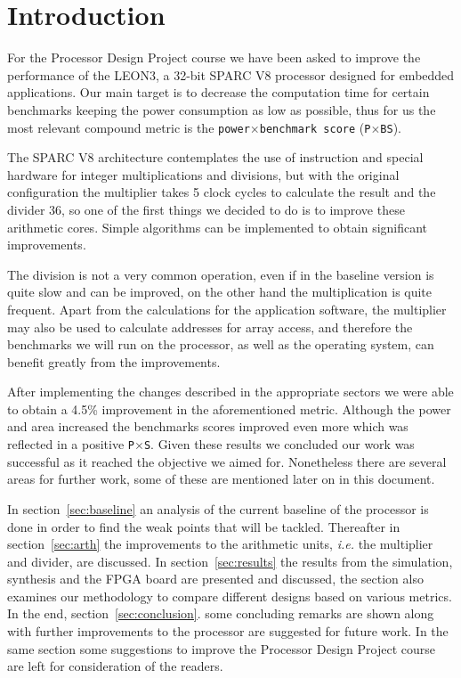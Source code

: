 
\section{Introduction}

For the Processor Design Project course we have been asked to improve the performance of the
LEON3, a 32-bit SPARC V8 processor designed for embedded applications.
Our main target is to decrease the computation time for certain benchmarks keeping the power
consumption as low as possible, thus for us the most relevant compound metric is the
\texttt{power}$\times$\texttt{benchmark score} (\texttt{P}$\times$\texttt{BS}).

The SPARC V8 architecture contemplates the use of instruction and special hardware for integer
multiplications and divisions, but with the original configuration the multiplier takes 5 clock cycles
to calculate the result and the divider 36, so one of the first things we decided to do is to improve
these arithmetic cores. Simple algorithms can be implemented to obtain significant improvements.

The division is not a very common operation, even if in the baseline version is quite slow and can be improved, on the other hand the multiplication is quite frequent. Apart from the calculations for the application software, the multiplier may also be used to calculate addresses for array access, and therefore the benchmarks we will run on the processor, as well as the operating system, can benefit greatly from the improvements.

After implementing the changes described in the appropriate sectors we were able to obtain a 4.5\% improvement in the aforementioned metric. Although the power and area increased the benchmarks scores improved even more which was reflected in a positive \texttt{P$\times$S}.
Given these results we concluded our work was successful as it reached the objective we aimed for. Nonetheless there are several areas for further work, some of these are mentioned later on in this document.


In section~\ref{sec:baseline} an analysis of the current baseline of the processor is done in order to find the weak points that will be tackled.
Thereafter in section~\ref{sec:arth} the improvements to the arithmetic units, \emph{i.e.} the multiplier and divider, are discussed.
In section~\ref{sec:results} the results from the simulation, synthesis and the FPGA board are presented and discussed, the section also examines our methodology to compare different designs based on various metrics.
In the end, section~\ref{sec:conclusion}. some concluding remarks are shown along with further improvements to the processor are suggested for future work. In the same section some suggestions to improve the Processor Design Project course are left for consideration of the readers.